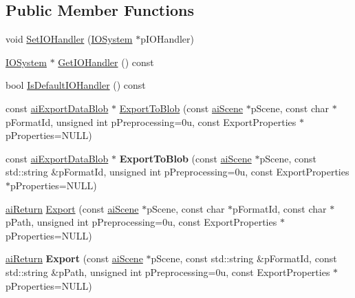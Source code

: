 \subsection*{Public Member Functions}
\begin{DoxyCompactItemize}
\item 
void \hyperlink{class_assimp_1_1_exporter_a054201cf78fa352b1281ea8b484f6e3a}{Set\-I\-O\-Handler} (\hyperlink{class_assimp_1_1_i_o_system}{I\-O\-System} $\ast$p\-I\-O\-Handler)
\item 
\hyperlink{class_assimp_1_1_i_o_system}{I\-O\-System} $\ast$ \hyperlink{class_assimp_1_1_exporter_a736d66db1a94de7df6eb978975e8d47a}{Get\-I\-O\-Handler} () const 
\item 
bool \hyperlink{class_assimp_1_1_exporter_a9ae1196f04cceb0d35fde6229ba41d0b}{Is\-Default\-I\-O\-Handler} () const 
\item 
const \hyperlink{structai_export_data_blob}{ai\-Export\-Data\-Blob} $\ast$ \hyperlink{class_assimp_1_1_exporter_ac4ed2314919873b943bccd7537130ed9}{Export\-To\-Blob} (const \hyperlink{structai_scene}{ai\-Scene} $\ast$p\-Scene, const char $\ast$p\-Format\-Id, unsigned int p\-Preprocessing=0u, const Export\-Properties $\ast$p\-Properties=\-N\-U\-L\-L)
\item 
\hypertarget{class_assimp_1_1_exporter_a1dd23c75e79a1ace1e769dcdd15e1607}{const \hyperlink{structai_export_data_blob}{ai\-Export\-Data\-Blob} $\ast$ {\bfseries Export\-To\-Blob} (const \hyperlink{structai_scene}{ai\-Scene} $\ast$p\-Scene, const std\-::string \&p\-Format\-Id, unsigned int p\-Preprocessing=0u, const Export\-Properties $\ast$p\-Properties=\-N\-U\-L\-L)}\label{class_assimp_1_1_exporter_a1dd23c75e79a1ace1e769dcdd15e1607}

\item 
\hyperlink{types_8h_a1f78dfb65090aa930cabb984c8abe711}{ai\-Return} \hyperlink{class_assimp_1_1_exporter_a3d5c3932f82097b29ff1fa635776f789}{Export} (const \hyperlink{structai_scene}{ai\-Scene} $\ast$p\-Scene, const char $\ast$p\-Format\-Id, const char $\ast$p\-Path, unsigned int p\-Preprocessing=0u, const Export\-Properties $\ast$p\-Properties=\-N\-U\-L\-L)
\item 
\hypertarget{class_assimp_1_1_exporter_a4d7aca488490655ec6e31a17f78e4535}{\hyperlink{types_8h_a1f78dfb65090aa930cabb984c8abe711}{ai\-Return} {\bfseries Export} (const \hyperlink{structai_scene}{ai\-Scene} $\ast$p\-Scene, const std\-::string \&p\-Format\-Id, const std\-::string \&p\-Path, unsigned int p\-Preprocessing=0u, const Export\-Properties $\ast$p\-Properties=\-N\-U\-L\-L)}\label{class_assimp_1_1_exporter_a4d7aca488490655ec6e31a17f78e4535}


\end{DoxyCompactItemize}
